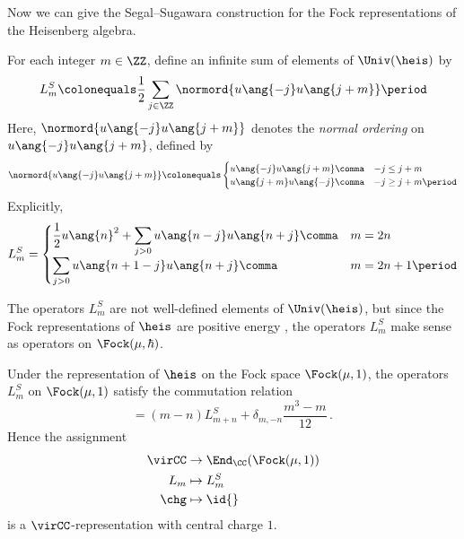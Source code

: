 Now we can give the Segal--Sugawara construction for the Fock representations of the Heisenberg algebra.

\begin{construction}
	For each integer $ m \in \ZZ $, define an infinite sum of elements of $ \Univ(\heis) $ by
	\begin{equation*}
		L_m^S \colonequals \frac{1}{2} \sum_{j \in \ZZ} \normord{u\ang{-j} u\ang{j+m}} \period
	\end{equation*}
	Here, $ \normord{u\ang{-j} u\ang{j+m}} $ denotes the \textit{normal ordering} on $ u\ang{-j} u\ang{j+m} $,
	defined by
	\begin{equation*}
		\normord{u\ang{-j} u\ang{j+m}} \colonequals \begin{cases}
			u\ang{-j} u\ang{j+m} \comma & -j \leq j + m \\ 
			u\ang{j+m} u\ang{-j} \comma & -j \geq j + m \period
		\end{cases}
	\end{equation*}
	Explicitly,
	\begin{equation*}
		L_m^S = \begin{cases}
			\displaystyle \frac{1}{2} u\ang{n}^2 +  \sum_{j > 0 } u\ang{n - j} u\ang{n + j} \comma & m = 2n \\ 
			\displaystyle \sum_{j > 0} u\ang{n + 1 - j} u\ang{n + j} \comma & m = 2n + 1 \period
		\end{cases}
	\end{equation*}
	
	The operators $ L_m^S $ are not well-defined elements of $ \Univ(\heis) $, but since the Fock representations of $ \heis $ are positive energy , the operators $ L_m^S $ make sense as operators on $ \Fock(\mu,\hbar) $.
\end{construction}

\begin{theorem}
	Under the representation of $ \heis $ on the Fock space $ \Fock(\mu,1) $, the operators $ L_{m}^S $ on $ \Fock(\mu,1) $ satisfy the commutation relation
	\begin{equation*}
		[L_m^S,L_n^S] = (m - n)L_{m+n}^S + \delta_{m,-n} \frac{m^3 - m}{12} \period
	\end{equation*}
	Hence the assignment
	\begin{align*}
		\virCC &\to \End_{\CC}(\Fock(\mu,1)) \\ 
		L_m &\mapsto L_{m}^S \\ 
		\chg &\mapsto \id{}
	\end{align*}
	is a $ \virCC $-representation with central charge $ 1 $.
\end{theorem}

